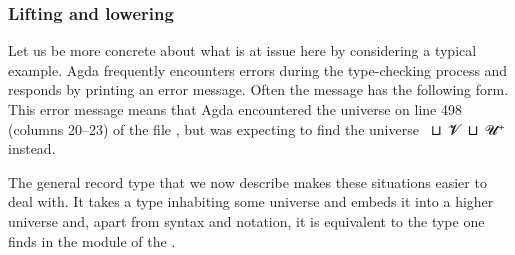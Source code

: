 \subsubsection{Lifting and lowering}\label{lifting-and-lowering}
Let us be more concrete about what is at issue here by considering a typical example. Agda frequently encounters errors during the type-checking process and responds by printing an error message. Often the message has the following form.
{\color{red}{\small
\begin{verbatim}
  Birkhoff.lagda:498,20-23
  𝓤 != 𝓞 ⊔ 𝓥 ⊔ (𝓤 ⁺) when checking that... has type...
\end{verbatim}}}
\noindent This error message means that Agda encountered the universe  on line 498 (columns 20--23) of the file , but was expecting to find the universe ~\aop ⊔~\ab 𝓥~\aop ⊔~\ab 𝓤\af ⁺ instead.


The general  record type that we now describe makes these situations easier to deal with. It takes a type inhabiting some universe and embeds it into a higher universe and, apart from syntax and notation, it is equivalent to the  type one finds in the  module of the \agdastdlib.
\ccpad
\begin{code}%
\>[0]\AgdaSpace{}%
\AgdaSpace{}%
\AgdaSymbol{\{}\AgdaSpace{}%
\AgdaSpace{}%
\AgdaSymbol{:}\AgdaSpace{}%
\AgdaSymbol{\}}\AgdaSpace{}%
\AgdaSymbol{(}\AgdaSpace{}%
\AgdaSymbol{:}\AgdaSpace{}%
\AgdaSpace{}%
\AgdaSymbol{)}\AgdaSpace{}%
\AgdaSymbol{:}\AgdaSpace{}%
\AgdaSpace{}%
\AgdaSpace{}%
\AgdaSpace{}%
%
\>[50]\<%
\\
\>[0][@{}l@{\AgdaIndent{0}}]%
\>[1]\AgdaSpace{}%
\<%
\\
%
\>[1]\AgdaSpace{}%
\AgdaSpace{}%
\AgdaSymbol{:}\AgdaSpace{}%
\<%
\\
\>[0]\AgdaSpace{}%
\<%
\end{code}
\scpad

